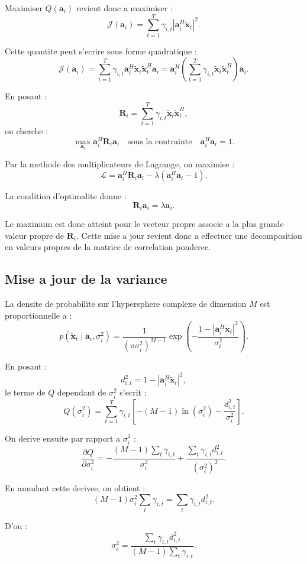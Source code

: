 \documentclass[11pt,a4paper]{article}
\begin{document}
Maximiser $Q(\mathbf{a}_i)$ revient donc a maximiser :
\[
  \mathcal{J}(\mathbf{a}_i)
    =
    \sum_{t=1}^{T}
    \gamma_{i,t}
    \left|
      \mathbf{a}_i^{H}\tilde{\mathbf{x}}_t
    \right|^2.
\]

Cette quantite peut s'ecrire sous forme quadratique :
\[
  \mathcal{J}(\mathbf{a}_i)
    =
    \sum_{t=1}^{T}
    \gamma_{i,t}
    \mathbf{a}_i^{H}
    \tilde{\mathbf{x}}_t
    \tilde{\mathbf{x}}_t^{H}
    \mathbf{a}_i
    =
    \mathbf{a}_i^{H}
    \left(
      \sum_{t=1}^{T}
      \gamma_{i,t}
      \tilde{\mathbf{x}}_t
      \tilde{\mathbf{x}}_t^{H}
    \right)
    \mathbf{a}_i.
\]

En posant :
\[
  \mathbf{R}_i
    =
    \sum_{t=1}^{T}
    \gamma_{i,t}
    \tilde{\mathbf{x}}_t
    \tilde{\mathbf{x}}_t^{H},
\]
on cherche :
\[
  \max_{\mathbf{a}_i}
  \mathbf{a}_i^{H}
  \mathbf{R}_i
  \mathbf{a}_i
  \quad
  \text{sous la contrainte}
  \quad
  \mathbf{a}_i^{H}\mathbf{a}_i=1.
\]

Par la methode des multiplicateurs de Lagrange, on maximise :
\[
  \mathcal{L}
    =
    \mathbf{a}_i^{H}
    \mathbf{R}_i
    \mathbf{a}_i
    -
    \lambda
    \left(
      \mathbf{a}_i^{H}\mathbf{a}_i
      -
      1
    \right).
\]

La condition d'optimalite donne :
\[
  \mathbf{R}_i\mathbf{a}_i
    =
    \lambda \mathbf{a}_i.
\]

Le maximum est donc atteint pour le vecteur propre associe a la plus grande
valeur propre de $\mathbf{R}_i$. Cette mise a jour revient donc a effectuer une
decomposition en valeurs propres de la matrice de correlation ponderee.

\subsection{Mise a jour de la variance}

La densite de probabilite sur l'hypersphere complexe de dimension $M$ est
proportionnelle a :
\[
  p\left(
    \tilde{\mathbf{x}}_t
    \mid
    \mathbf{a}_i,\sigma_i^2
  \right)
  =
  \frac{1}
       {(\pi\sigma_i^2)^{M-1}}
  \exp\left(
    -
    \frac{
      1-\left|\mathbf{a}_i^{H}\tilde{\mathbf{x}}_t\right|^2
    }
    {\sigma_i^2}
  \right).
\]

En posant :
\[
  d_{i,t}^2
    =
    1
    -
    \left|
      \mathbf{a}_i^{H}\tilde{\mathbf{x}}_t
    \right|^2,
\]
le terme de $Q$ dependant de $\sigma_i^2$ s'ecrit :
\[
  Q(\sigma_i^2)
    =
    \sum_{t=1}^{T}
    \gamma_{i,t}
    \left[
      -(M-1)\ln(\sigma_i^2)
      -
      \frac{d_{i,t}^2}{\sigma_i^2}
    \right].
\]

On derive ensuite par rapport a $\sigma_i^2$ :
\[
  \frac{\partial Q}{\partial \sigma_i^2}
    =
    -
    \frac{
      (M-1)\sum_t \gamma_{i,t}
    }
    {\sigma_i^2}
    +
    \frac{
      \sum_t \gamma_{i,t}d_{i,t}^2
    }
    {(\sigma_i^2)^2}.
\]

En annulant cette derivee, on obtient :
\[
  (M-1)\sigma_i^2\sum_t\gamma_{i,t}
    =
    \sum_t\gamma_{i,t}d_{i,t}^2.
\]

D'ou :
\[
  \sigma_i^2
    =
    \frac{
      \sum_t \gamma_{i,t}d_{i,t}^2
    }
    {
      (M-1)\sum_t \gamma_{i,t}
    }.
\]
\end{document}
